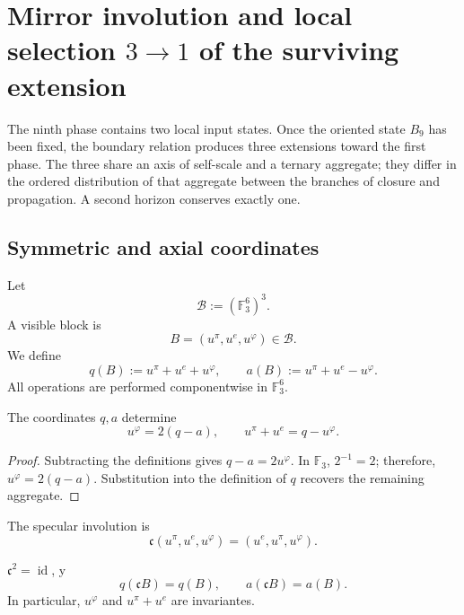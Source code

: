 
\chapter{Mirror involution and local selection \(3\to1\) of the surviving extension}
\label{chap:espejo-seleccion-tres-uno}

The ninth phase contains two local input states. Once the oriented
state \(B_9\) has been fixed, the boundary relation produces three extensions
toward the first phase. The three share an axis of self-scale and a ternary
aggregate; they differ in the ordered distribution of that aggregate between the branches of
closure and propagation. A second horizon conserves exactly one.

\section{Symmetric and axial coordinates}

Let
\[
 \mathcal B:=(\mathbb F_3^6)^3.
\]
A visible block is
\[
 B=(u^\pi,u^e,u^\varphi)\in\mathcal B.
\]
We define
\[
 q(B):=u^\pi+u^e+u^\varphi,
 \qquad
 a(B):=u^\pi+u^e-u^\varphi.
\]
All operations are performed componentwise in
\(\mathbb F_3^6\).

\begin{theorem}
\label{thm:espejo-reconstruccion-eje-agregado}
The coordinates \(q,a\) determine
\[
 \boxed{u^\varphi=2(q-a),}
 \qquad
 \boxed{u^\pi+u^e=q-u^\varphi.}
\]
\end{theorem}

\begin{proof}
Subtracting the definitions gives
\(q-a=2u^\varphi\). In \(\mathbb F_3\), \(2^{-1}=2\); therefore,
\(u^\varphi=2(q-a)\). Substitution into the definition of \(q\) recovers the
remaining aggregate.
\end{proof}

The specular involution is
\[
 \mathfrak c(u^\pi,u^e,u^\varphi)
 =(u^e,u^\pi,u^\varphi).
\]

\begin{proposition}
\label{prop:espejo-invariantes}
\(\mathfrak c^2=\operatorname{id}\), y
\[
 q(\mathfrak cB)=q(B),
 \qquad
 a(\mathfrak cB)=a(B).
\]
In particular, \(u^\varphi\) and \(u^\pi+u^e\) are invariantes.
\end{proposition}

